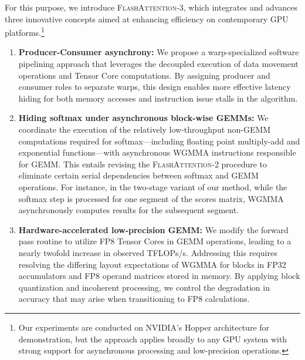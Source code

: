 For this purpose, we introduce \textsc{FlashAttention-3}, which integrates and advances three innovative concepts aimed at enhancing efficiency on contemporary GPU platforms.\footnote{Our experiments are conducted on NVIDIA's Hopper architecture for demonstration, but the approach applies broadly to any GPU system with strong support for asynchronous processing and low-precision operations.}

\begin{enumerate}

\item \textbf{Producer-Consumer asynchrony:} We propose a warp-specialized software pipelining approach that leverages the decoupled execution of data movement operations and Tensor Core computations. By assigning producer and consumer roles to separate warps, this design enables more effective latency hiding for both memory accesses and instruction issue stalls in the algorithm.
\item \textbf{Hiding softmax under asynchronous block-wise GEMMs:} We coordinate the execution of the relatively low-throughput non-GEMM computations required for softmax—including floating point multiply-add and exponential functions—with asynchronous WGMMA instructions responsible for GEMM. This entails revising the \textsc{FlashAttention-2} procedure to eliminate certain serial dependencies between softmax and GEMM operations. For instance, in the two-stage variant of our method, while the softmax step is processed for one segment of the scores matrix, WGMMA asynchronously computes results for the subsequent segment.
\item \textbf{Hardware-accelerated low-precision GEMM:} We modify the forward pass routine to utilize FP8 Tensor Cores in GEMM operations, leading to a nearly twofold increase in observed TFLOPs/s. Addressing this requires resolving the differing layout expectations of WGMMA for blocks in FP32 accumulators and FP8 operand matrices stored in memory. By applying block quantization and incoherent processing, we control the degradation in accuracy that may arise when transitioning to FP8 calculations.


\end{enumerate}
